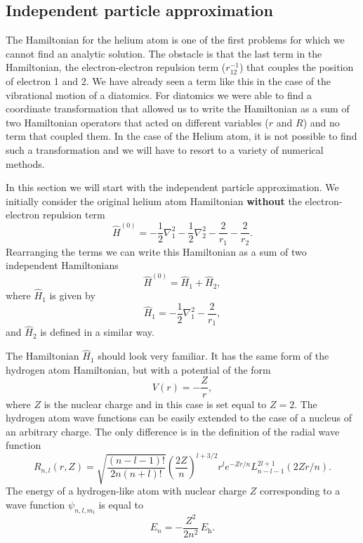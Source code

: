 \documentclass[../Main/chem331-notes.tex]{subfiles}
\begin{document}
\subsection{Independent particle approximation}
The Hamiltonian for the helium atom is one of the first problems for which we cannot find an analytic solution.
The obstacle is that the last term in the Hamiltonian, the electron-electron repulsion term ($r_{12}^{-1}$) that couples the position of electron 1 and 2.
We have already seen a term like this in the case of the vibrational motion of a diatomics.
For diatomics we were able to find a coordinate transformation that allowed us to write the Hamiltonian as a sum of two Hamiltonian operators that acted on different variables ($r$ and $R$) and no term that coupled them.
In the case of the Helium atom, it is not possible to find such a transformation and we will have to resort to a variety of numerical methods.

In this section we will start with the independent particle approximation.
We initially consider the original helium atom Hamiltonian \textbf{without} the electron-electron repulsion  term
\begin{equation}
\hat{H}^{(0)} = -\frac{1}{2} \nabla^2_1 -\frac{1}{2} \nabla^2_2 - \frac{2}{r_1} - \frac{2}{r_2}.
\end{equation}
Rearranging the terms we can write this Hamiltonian as a sum of two independent Hamiltonians
\begin{equation}
\hat{H}^{(0)}  = \hat{H}_1 +  \hat{H}_2,
\end{equation}
where $\hat{H}_1$ is given by
\begin{equation}
\hat{H}_1 =  -\frac{1}{2} \nabla^2_1 - \frac{2}{r_1},
\end{equation}
and $\hat{H}_2$ is defined in a similar way.

The Hamiltonian $\hat{H}_1$ should look very familiar.
It has the same form of the hydrogen atom Hamiltonian, but with a potential of the form
\begin{equation}
V(r) = - \frac{Z}{r},
\end{equation}
where $Z$ is the nuclear charge and in this case is set equal to $Z = 2$.
The hydrogen atom wave functions can be easily extended to the case of a nucleus of an arbitrary charge. The only difference is in the definition of the radial wave function
\begin{equation}
R_{n,l}(r,Z) = \sqrt{\frac{ (n-l-1)! }{ 2n (n+l)!} } \left(\frac{2Z}{n} \right)^{l + 3/2} r^l e^{-Zr/n} L_{n-l-1}^{2l+1}(2Zr/n).
\end{equation}
The energy of a hydrogen-like atom with nuclear charge $Z$ corresponding to a wave function $\psi_{n,l,m_l}$ is equal to
\begin{equation}
E_n = -\frac{Z^2}{2n^2} \, E_\mathrm{h}.
\end{equation}
\end{document}
